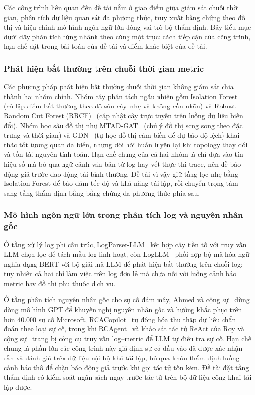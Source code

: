 Các công trình liên quan đến đề tài nằm ở giao điểm giữa giám sát chuỗi thời gian, phân tích dữ liệu quan sát đa phương thức, truy xuất bằng chứng theo đồ thị và hiệu chỉnh mô hình ngôn ngữ lớn đóng vai trò bộ thẩm định. Bảy tiểu mục dưới đây phân tích từng nhánh theo cùng một trục: cách tiếp cận của công trình, hạn chế đặt trong bài toán của đề tài và điểm khác biệt của đề tài.

\subsubsection{Phát hiện bất thường trên chuỗi thời gian metric}
\label{sec:ch3-tsad}

Các phương pháp phát hiện bất thường chuỗi thời gian không giám sát chia thành hai nhóm chính. Nhóm cây phân tách ngẫu nhiên gồm Isolation Forest~\cite{isof} (cô lập điểm bất thường theo độ sâu cây, nhẹ và không cần nhãn) và Robust Random Cut Forest (RRCF)~\cite{guha2016robust} (cập nhật cây trực tuyến trên luồng dữ liệu biến đổi). Nhóm học sâu đồ thị như MTAD-GAT~\cite{zhao2020multivariate} (chú ý đồ thị song song theo đặc trưng và thời gian) và GDN~\cite{deng2021graph} (tự học đồ thị cảm biến để dự báo độ lệch) khai thác tốt tương quan đa biến, nhưng đòi hỏi huấn luyện lại khi topology thay đổi và tốn tài nguyên tính toán. Hạn chế chung của cả hai nhóm là chỉ dựa vào tín hiệu số mà bỏ qua ngữ cảnh văn bản từ log hay vết thực thi trace, nên dễ báo động giả trước dao động tải bình thường. Đề tài vì vậy giữ tầng lọc nhẹ bằng Isolation Forest để bảo đảm tốc độ và khả năng tái lập, rồi chuyển trọng tâm sang tầng thẩm định bằng bằng chứng đa phương thức phía sau.

\subsubsection{Mô hình ngôn ngữ lớn trong phân tích log và nguyên nhân gốc}
\label{sec:ch3-llm-log-rca}

Ở tầng xử lý log phi cấu trúc, LogParser-LLM~\cite{zhong2024logparser} kết hợp cây tiền tố với truy vấn LLM chọn lọc để tách mẫu log linh hoạt, còn LogLLM~\cite{wang2024logllm} phối hợp bộ mã hóa ngữ nghĩa dạng BERT với bộ giải mã LLM để phát hiện bất thường trên chuỗi log; tuy nhiên cả hai chỉ làm việc trên log đơn lẻ mà chưa nối với luồng cảnh báo metric hay đồ thị phụ thuộc dịch vụ.

Ở tầng phân tích nguyên nhân gốc cho sự cố đám mây, Ahmed và cộng sự~\cite{ahmed2023recommending} dùng dòng mô hình GPT để khuyến nghị nguyên nhân gốc và hướng khắc phục trên hơn 40.000 sự cố Microsoft, RCACopilot~\cite{chen2024rcacopilot} tự động hóa thu thập dữ liệu chẩn đoán theo loại sự cố, trong khi RCAgent~\cite{rcagent2023} và khảo sát tác tử ReAct của Roy và cộng sự~\cite{roy2024exploring} trang bị công cụ truy vấn log--metric để LLM tự điều tra sự cố. Hạn chế chung là phần lớn các công trình này giả định sự cố đầu vào đã được xác nhận sẵn và đánh giá trên dữ liệu nội bộ khó tái lập, bỏ qua khâu thẩm định luồng cảnh báo thô để chặn báo động giả trước khi gọi tác tử tốn kém. Đề tài đặt tầng thẩm định \CTAV{} có kiểm soát ngân sách ngay trước tác tử  trên bộ dữ liệu công khai tái lập được.

